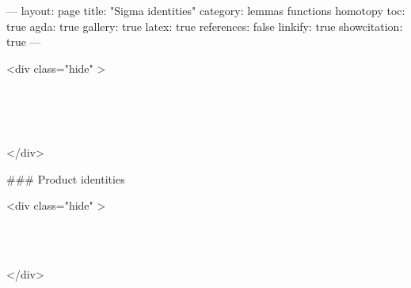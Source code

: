---
layout: page
title: "Sigma identities"
category: lemmas functions homotopy
toc: true
agda: true
gallery: true
latex: true
references: false
linkify: true
showcitation: true
---

<div class="hide" >
\begin{code}%
\>[0]\AgdaSymbol{\{-\#}\AgdaSpace{}%
\AgdaSpace{}%
\AgdaSpace{}%
\AgdaSymbol{\#-\}}\<%
\\
\>[0]\AgdaSpace{}%
\AgdaSpace{}%
\<%
\\
\>[0]\AgdaSpace{}%
\AgdaSpace{}%
\<%
\\
\>[0]\AgdaSpace{}%
\AgdaSpace{}%
\<%
\end{code}
</div>

### Product identities

<div class="hide" >
\begin{code}%
\>[0]\<%
\\
\>[0][@{}l@{\AgdaIndent{0}}]%
\>[2]\<%
\\
%
\>[2]\<%
\end{code}
</div>


